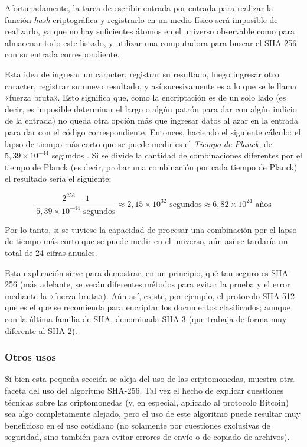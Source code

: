 \documentclass[12pt,a4paper,twoside]{book}
\begin{document}
Afortunadamente, la tarea de escribir entrada por entrada para realizar la función \textit{hash} criptográfica y registrarlo en un medio físico será imposible de realizarlo, ya que no hay suficientes átomos en el universo observable \cite{atomos-universo} como para almacenar todo este listado, y utilizar una computadora para buscar el SHA-256 con su entrada correspondiente.

Esta idea de ingresar un caracter, registrar su resultado, luego ingresar otro caracter, registrar su nuevo resultado, y así sucesivamente es a lo que se le llama «fuerza bruta». Esto significa que, como la encriptación es de un solo lado (es decir, es imposible determinar el largo o algún patrón para dar con algún indicio de la entrada) no queda otra opción más que ingresar datos al azar en la entrada para dar con el código correspondiente. Entonces, haciendo el siguiente cálculo: el lapso de tiempo más corto que se puede medir es el \textit{Tiempo de Planck}, de $ 5,39 \times 10^{-44} $ segundos \cite{tiempo-planck}. Si se divide la cantidad de combinaciones diferentes por el tiempo de Planck (es decir, probar una combinación por cada tiempo de Planck) el resultado sería el siguiente:

\begin{equation*}
\dfrac{2^{256}-1}{5,39 \times 10^{-44} \text{ segundos}} \approx 2,15 \times 10^{32} \text{ segundos} \approx 6,82 \times 10^{24} \text{ años}
\end{equation*}

Por lo tanto, si se tuviese la capacidad de procesar una combinación por el lapso de tiempo más corto que se puede medir en el universo, aún así se tardaría un total de 24 cifras anuales. 

Esta explicación sirve para demostrar, en un principio, qué tan seguro es SHA-256 (más adelante, se verán diferentes métodos para evitar la prueba y el error mediante la «fuerza bruta»). Aún así, existe, por ejemplo, el protocolo SHA-512 que es el que se recomienda para encriptar los documentos clasificados; aunque con la última familia de SHA, denominada SHA-3 (que trabaja de forma muy diferente al SHA-2).

\subsubsection{Otros usos}
Si bien esta pequeña sección se aleja del uso de las criptomonedas, muestra otra faceta del uso del algoritmo SHA-256. Tal vez el hecho de explicar cuestiones técnicas sobre las criptomonedas (y, en especial, aplicado al protocolo Bitcoin) sea algo completamente alejado, pero el uso de este algoritmo puede resultar muy beneficioso en el uso cotidiano (no solamente por cuestiones exclusivas de seguridad, sino también para evitar errores de envío o de copiado de archivos).
\end{document}
